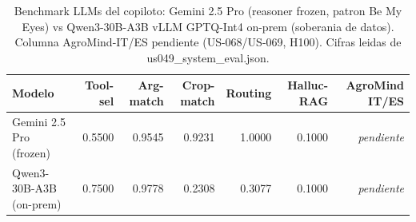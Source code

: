 \begin{table}
\caption{Benchmark LLMs del copiloto: Gemini 2.5 Pro (reasoner frozen, patron Be My Eyes) vs Qwen3-30B-A3B vLLM GPTQ-Int4 on-prem (soberania de datos). Columna AgroMind-IT/ES pendiente (US-068/US-069, H100). Cifras leidas de us049\_system\_eval.json.}
\label{tab:llm_benchmark}
\begin{tabular}{lrrrrrr}
\toprule
Modelo & Tool-sel & Arg-match & Crop-match & Routing & Halluc-RAG & AgroMind IT/ES \\
\midrule
Gemini 2.5 Pro (frozen) & 0.5500 & 0.9545 & 0.9231 & 1.0000 & 0.1000 & \textit{pendiente} \\
Qwen3-30B-A3B (on-prem) & 0.7500 & 0.9778 & 0.2308 & 0.3077 & 0.1000 & \textit{pendiente} \\
\bottomrule
\end{tabular}
\end{table}
